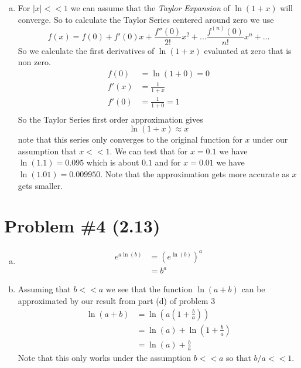 \documentclass[11pt]{article}
\numberwithin{equation}{section}
\begin{document}
\begin{enumerate}[(a)]
\item
For $|x|<<1$ we can assume that the \emph{Taylor Expansion} of $\ln(1+x)$ will converge. So to calculate the Taylor Series centered around zero we use
$$f(x) = f(0) + f'(0)x + \frac{f''(0)}{2!}x^2 + ... \frac{f^{(n)}(0)}{n!}x^n + ...$$
So we calculate the first derivatives of $\ln(1+x)$ evaluated at zero that is non zero.
\begin{align*}
f(0) &= \ln(1+0) = 0\\
f'(x) &= \frac{1}{1+x}\\
f'(0) &= \frac{1}{1+0} = 1\\
\end{align*}
So the Taylor Series first order approximation gives 
$$\ln(1+x) \approx x$$
note that this series only converges to the original function for $x$ under our assumption that $x<<1$. We can test that for $x=0.1$ we have $\ln(1.1) = 0.095$ which is about $0.1$ and for $x=0.01$ we have $\ln(1.01) = 0.009950$. Note that the approximation gets more accurate as $x$ gets smaller.
\end{enumerate}

\section{Problem \#4 (2.13)}
\begin{enumerate}[(a)]
\item
\begin{align*}
e^{a\ln(b)} &= \left(e^{\ln(b)}\right)^a\\
&= b^a
\end{align*}

\item
Assuming that $b<<a$ we see that the function $\ln(a+b)$ can be approximated by our result from part (d) of problem 3
\begin{align*}
\ln(a+b) &= \ln\left(a\left(1+\frac{b}{a}\right)\right)\\
&= \ln(a) + \ln\left(1+\frac{b}{a}\right)\\
&= \ln(a) + \frac{b}{a}
\end{align*}
Note that this only works under the assumption $b<<a$ so that $b/a<<1$.
\end{enumerate}
\end{document}

